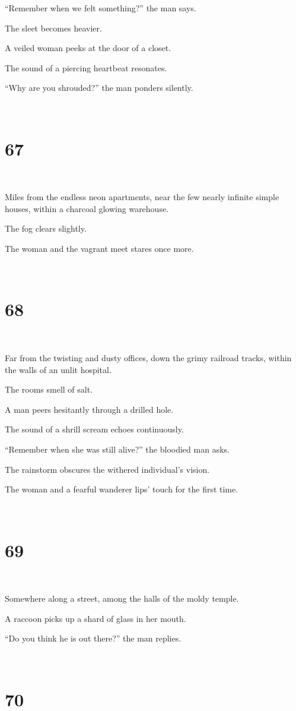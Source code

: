 \documentclass{report}
\begin{document}
``Remember when we felt something?'' the man says.

The sleet becomes heavier.

A veiled woman peeks at the door of a closet.

The sound of a piercing heartbeat resonates.

``Why are you shrouded?'' the man ponders silently.

~
\chapter*{67}
~

Miles from the endless neon apartments, near the few nearly infinite simple houses, within a charcoal glowing warehouse.

The fog clears slightly.

The woman and the vagrant meet stares once more.

~
\chapter*{68}
~

Far from the twisting and dusty offices, down the grimy railroad tracks, within the walls of an unlit hospital.

The rooms smell of salt.

A man peers hesitantly through a drilled hole.

The sound of a shrill scream echoes continuously.

``Remember when she was still alive?'' the bloodied man asks.

The rainstorm obscures the withered individual's vision.

The woman and a fearful wanderer lips' touch for the first time.

~
\chapter*{69}
~

Somewhere along a street, among the halls of the moldy temple.

A raccoon picks up a shard of glass in her mouth.

``Do you think he is out there?'' the man replies.

~
\chapter*{70}
~
\end{document}

